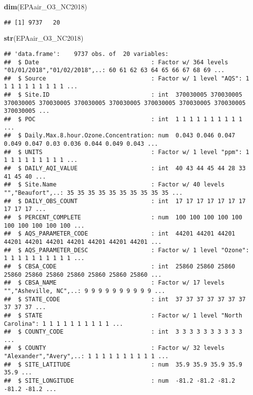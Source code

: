 \documentclass[]{article}
\newenvironment{Shaded}{\begin{snugshade}}{\end{snugshade}}
\newcommand{\KeywordTok}[1]{\textcolor[rgb]{0.13,0.29,0.53}{\textbf{#1}}}
\newcommand{\NormalTok}[1]{#1}
\begin{document}
\begin{Shaded}
\begin{Highlighting}[]
\KeywordTok{dim}\NormalTok{(EPAair_O3_NC2018)}
\end{Highlighting}
\end{Shaded}

\begin{verbatim}
## [1] 9737   20
\end{verbatim}

\begin{Shaded}
\begin{Highlighting}[]
\KeywordTok{str}\NormalTok{(EPAair_O3_NC2018)}
\end{Highlighting}
\end{Shaded}

\begin{verbatim}
## 'data.frame':    9737 obs. of  20 variables:
##  $ Date                                : Factor w/ 364 levels "01/01/2018","01/02/2018",..: 60 61 62 63 64 65 66 67 68 69 ...
##  $ Source                              : Factor w/ 1 level "AQS": 1 1 1 1 1 1 1 1 1 1 ...
##  $ Site.ID                             : int  370030005 370030005 370030005 370030005 370030005 370030005 370030005 370030005 370030005 370030005 ...
##  $ POC                                 : int  1 1 1 1 1 1 1 1 1 1 ...
##  $ Daily.Max.8.hour.Ozone.Concentration: num  0.043 0.046 0.047 0.049 0.047 0.03 0.036 0.044 0.049 0.043 ...
##  $ UNITS                               : Factor w/ 1 level "ppm": 1 1 1 1 1 1 1 1 1 1 ...
##  $ DAILY_AQI_VALUE                     : int  40 43 44 45 44 28 33 41 45 40 ...
##  $ Site.Name                           : Factor w/ 40 levels "","Beaufort",..: 35 35 35 35 35 35 35 35 35 35 ...
##  $ DAILY_OBS_COUNT                     : int  17 17 17 17 17 17 17 17 17 17 ...
##  $ PERCENT_COMPLETE                    : num  100 100 100 100 100 100 100 100 100 100 ...
##  $ AQS_PARAMETER_CODE                  : int  44201 44201 44201 44201 44201 44201 44201 44201 44201 44201 ...
##  $ AQS_PARAMETER_DESC                  : Factor w/ 1 level "Ozone": 1 1 1 1 1 1 1 1 1 1 ...
##  $ CBSA_CODE                           : int  25860 25860 25860 25860 25860 25860 25860 25860 25860 25860 ...
##  $ CBSA_NAME                           : Factor w/ 17 levels "","Asheville, NC",..: 9 9 9 9 9 9 9 9 9 9 ...
##  $ STATE_CODE                          : int  37 37 37 37 37 37 37 37 37 37 ...
##  $ STATE                               : Factor w/ 1 level "North Carolina": 1 1 1 1 1 1 1 1 1 1 ...
##  $ COUNTY_CODE                         : int  3 3 3 3 3 3 3 3 3 3 ...
##  $ COUNTY                              : Factor w/ 32 levels "Alexander","Avery",..: 1 1 1 1 1 1 1 1 1 1 ...
##  $ SITE_LATITUDE                       : num  35.9 35.9 35.9 35.9 35.9 ...
##  $ SITE_LONGITUDE                      : num  -81.2 -81.2 -81.2 -81.2 -81.2 ...
\end{verbatim}
\end{document}
